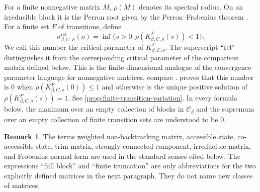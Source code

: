 \documentclass[11pt]{article}
\theoremstyle{definition}
\newtheorem*{remark*}{Remark}
\newcommand{\rel}{\mathrm{rel}}
\begin{document}
For a finite nonnegative matrix $M$, $\rho(M)$ denotes its spectral radius.  On an
irreducible block it is the Perron root given by the Perron--Frobenius theorem
\cite[Chapter~1]{Seneta2006}.  For a finite set $F$ of transitions, define
\[
 \sigma^{\rel}_{\beta,C,F}(o)=
 \inf\{s>0:\rho(K^F_{\beta,C,o}(s))<1\}.
\]
We call this number the critical parameter of $K^F_{\beta,C,o}$.  The superscript $``\rel"$
distinguishes it from the corresponding critical parameter of the comparison matrix defined
below.  This is the finite-dimensional analogue of the convergence-parameter language for
nonnegative matrices, compare \cite[Sections~2--3]{VereJones1967}.   proves that this number is $0$ when
$\rho(K^F_{\beta,C,o}(0))\le1$ and otherwise is the unique positive solution of
$\rho(K^F_{\beta,C,o}(s))=1$. See \cref{prop:finite-transition-variation}.  In every formula
below, the maximum over an empty collection of blocks in $\mathscr C_\beta$ and the
supremum over an empty collection of finite transition sets are understood to be $0$.
\begin{remark*}
The terms weighted non-backtracking matrix, accessible state, co-accessible state, trim
matrix, strongly connected component, irreducible matrix, and Frobenius normal form are used
in the standard senses cited below.  The expressions ``full block'' and ``finite truncation''
are only abbreviations for the two explicitly defined matrices in the next paragraph. They do
not name new classes of matrices.
\end{remark*}
\end{document}
